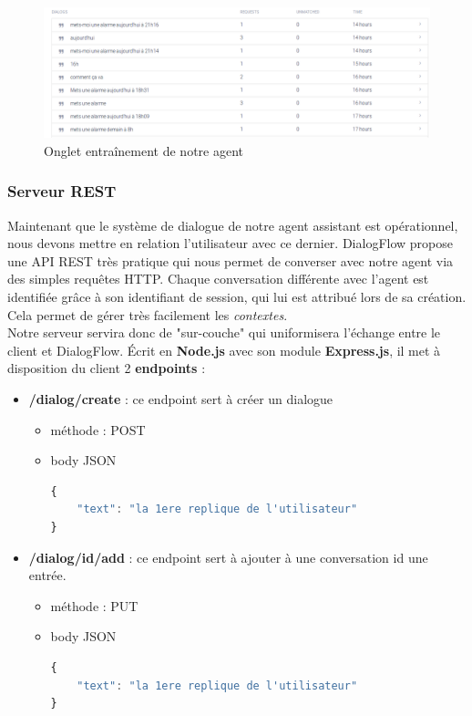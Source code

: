 \begin{figure}[H]
    \centering
        \centering
        \includegraphics[width=1.2\textwidth]{images/training.png}
        \caption{Onglet entraînement de notre agent}
\end{figure}


\subsubsection{Serveur REST}

Maintenant que le système de dialogue de notre agent assistant est opérationnel, nous devons mettre en relation l'utilisateur avec ce dernier. DialogFlow propose une API REST très pratique
qui nous permet de converser avec notre agent via des simples requêtes HTTP. Chaque conversation différente avec l'agent est identifiée grâce à son identifiant de session,
qui lui est attribué lors de sa création. Cela permet de gérer très facilement les \emph{contextes}.\\

Notre serveur servira donc de "sur-couche" qui uniformisera l'échange entre le client et DialogFlow. Écrit en \textbf{Node.js} avec son module \textbf{Express.js},
il met à disposition du client 2 \textbf{endpoints} :\\
\begin{itemize}
    \item \textbf{/dialog/create} : ce endpoint sert à créer un dialogue
    \begin{itemize}
        \item méthode : POST
        \item body JSON 
        \begin{lstlisting}[language=Javascript]
{
    "text": "la 1ere replique de l'utilisateur"
}
        \end{lstlisting}
    \end{itemize}
    \item \textbf{/dialog/{id}/add} : ce endpoint sert à ajouter à une conversation id une entrée.
    \begin{itemize}
        \item méthode : PUT
        \item body JSON 
        \begin{lstlisting}[language=Javascript]
{
    "text": "la 1ere replique de l'utilisateur"
}
        \end{lstlisting}
    \end{itemize}
\end{itemize}



